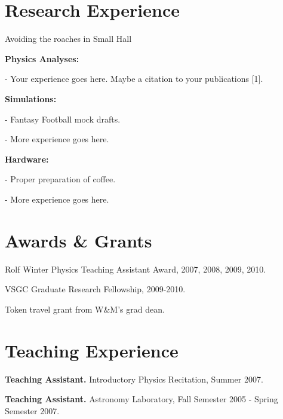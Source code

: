\documentclass[letterpaper,10pt]{article}
\renewenvironment{itemize}{
  \begin{list}{}{
    \setlength{\leftmargin}{1.5em}
  }
}{
  \end{list}
}
\begin{document}
\section*{Research Experience}
\begin{itemize}
\item Avoiding the roaches in Small Hall
 \begin{itemize}
  \item \textbf{Physics Analyses:} 
    \begin{itemize}
     \item - Your experience goes here. Maybe a citation to your publications [1].    
     \end{itemize}

  \item \textbf{Simulations:}
    \begin{itemize}
      \item - Fantasy Football mock drafts.
      \item - More experience goes here.
    \end{itemize}

  \item \textbf{Hardware:}
    \begin{itemize}
     \item - Proper preparation of coffee.
     \item - More experience goes here.
    \end{itemize}
 
\end{itemize}
\end{itemize}


\section*{Awards \& Grants}
\begin{itemize}
  \item Rolf Winter Physics Teaching Assistant Award, 2007, 2008, 2009, 2010. 
  \item VSGC Graduate Research Fellowship, 2009-2010.
  \item Token travel grant from W\&M's grad dean. 
\end{itemize}

\section*{Teaching Experience}
\begin{itemize}
  \item \textbf{Teaching Assistant.} Introductory Physics Recitation, Summer 2007. 
  \item \textbf{Teaching Assistant.} Astronomy Laboratory, Fall Semester 2005 - Spring Semester 2007.
\end{itemize}
\end{document}
